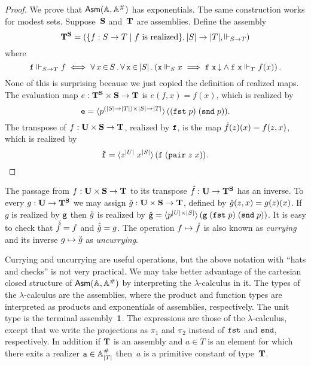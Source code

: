 \begin{proof}
  We prove that $\mathsf{Asm}(\mathbb{A},\mathbb{A}^{\#})$ has exponentials. The same construction works
  for modest sets. Suppose~$\mathbf{S}$ and~$\mathbf{T}$ are assemblies.
  Define the assembly
  \begin{equation*}
    \mathbf{T}^{\mathbf{S}} =
    (\{f : S \to T \mid \text{$f$ is realized}\},
     |S| \to |T|, {\Vdash_{S \to T}})
  \end{equation*}
  where
  \begin{equation*}
    \mathtt{f} \Vdash_{S \to T} f
    \iff
    \forall\, x \,{\in}\, S\,.\,
      \forall\, \mathtt{x} \,{\in}\, |S|\,.\left(
          \mathtt{x} \Vdash_S x \implies
          \mathtt{f}\;\mathtt{x}\,{\downarrow} \land
          \mathtt{f}\;\mathtt{x} \Vdash_T f(x)
        \right)
     .
  \end{equation*}
  None of this is surprising because we just copied the definition of
  realized maps. The evaluation map $e : \mathbf{T}^{\mathbf{S}} \times
  \mathbf{S} \to \mathbf{T}$ is $e(f, x) = f(x)$, which is realized by
  \begin{equation*}
    \mathtt{e} = \langle p^{(|S| \to |T|) \times |S| \to
      |T|} \rangle\,((\mathtt{fst}\;p)\;(\mathtt{snd}\;p)).
  \end{equation*}
  The transpose of $f : \mathbf{U} \times \mathbf{S} \to \mathbf{T}$, realized
  by $\mathtt{f}$, is the map $\hat{f}(z)(x) = f(z,x)$, which is realized
  by
  \begin{equation*}
    \mathtt{\hat{f}} = \langle z^{|U|} \; x^{|S|} \rangle\,(
      \mathtt{f}\;(\mathtt{pair}\;z\;x)
    ).
  \end{equation*}
\end{proof}

The passage from $f : \mathbf{U} \times \mathbf{S} \to \mathbf{T}$ to its
transpose $\hat{f} : \mathbf{U} \to \mathbf{T}^{\mathbf{S}}$ has an inverse.
To every $g : \mathbf{U} \to \mathbf{T}^{\mathbf{S}}$ we may assign
$\check{g} : \mathbf{U} \times \mathbf{S} \to \mathbf{T}$, defined by
$\check{g}(z,x) = g(z)(x)$. If $g$ is realized by $\mathtt{g}$ then
$\check{g}$ is realized by $\check{\mathtt{g}} = \langle p^{|U|
    \times |S|} \rangle\,(\mathtt{g}\;(\mathtt{fst}\;p)\;(\mathtt{snd}\;p))$. It is easy to
check that $\check{\hat{f}} = f$ and $\hat{\check{g}} = g$.
The operation $f \mapsto \hat{f}$ is also known as \emph{currying}
and its inverse $g \mapsto \check{g}$ as \emph{uncurrying}.

Currying and uncurrying are useful operations, but the above notation
with ``hats and checks'' is not very practical. We may take better
advantage of the cartesian closed structure of $\mathsf{Asm}(\mathbb{A},\mathbb{A}^{\#})$ by interpreting
the $\lambda$-calculus in it. The types of the $\lambda$-calculus are
the assemblies, where the product and function types are interpreted
as products and exponentials of assemblies, respectively. The unit
type is the terminal assembly~$\mathsf{1}$. The expressions are those of the
$\lambda$-calculus, except that we write the projections as $\pi_1$
and $\pi_2$ instead of $\mathtt{fst}$ and $\mathtt{snd}$, respectively. In
addition if $\mathbf{T}$ is an assembly and $a \in T$ is an element for
which there exits a realizer $\mathtt{a} \in \mathbb{A}^{\#}_{|T|}$ then~$a$ is a
primitive constant of type~$\mathbf{T}$.

